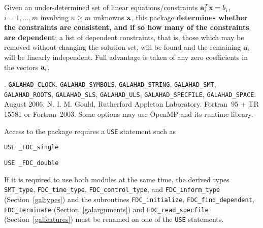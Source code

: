 \documentclass{galahad}
\newcommand{\packagename}{FDC}
\newcommand{\fullpackagename}{\libraryname\_\-\packagename}
\begin{document}
\galheader


\galsummary
Given an under-determined set of linear equations/constraints
${\mathbf{a}}_i^T {\mathbf{x}} = b_i^{}$,
$i = 1, \ldots, m$ involving $n \geq m$ unknowns ${\mathbf{x}}$, this package
{\bf determines whether the constraints are consistent, and if so how many
of the constraints are dependent}; a list of dependent constraints, that
is, those which may be removed without changing the solution set, will be found
and the remaining ${\mathbf{a}}_i$ will be linearly independent.
Full advantage is taken of any zero coefficients in the vectors ${\mathbf{a}}_i$.


\galattributes
\galversions{\tt  \fullpackagename\_single, \fullpackagename\_double}.
\galuses
{\tt GALAHAD\_\-CLOCK},
{\tt GALAHAD\_SY\-M\-BOLS}, {\tt GALAHAD\_\-STRING},
{\tt GALAHAD\_SMT}, {\tt GALAHAD\_\-ROOTS}, {\tt GALAHAD\_\-SLS},
{\tt GALAHAD\_\-ULS}, {\tt GALAHAD\_SPECFILE}, {\tt GALAHAD\-\_SPACE}.
\galdate August  2006.
\galorigin N. I. M. Gould, Rutherford Appleton Laboratory.
\gallanguage Fortran~95 + TR 15581 or Fortran~2003.
\galparallelism Some options may use OpenMP and its runtime library.


\galhowto


Access to the package requires a {\tt USE} statement such as

\medskip{}

\hspace{8mm} {\tt USE \fullpackagename\_single}

\medskip{}

\hspace{8mm} {\tt USE  \fullpackagename\_double}

\medskip

\noindent
If it is required to use both modules at the same time, the derived types
{\tt SMT\_type},
{\tt \packagename\_time\_type},
{\tt \packagename\_control\_type},
and
{\tt \packagename\_inform\_type}
(Section~\ref{galtypes})
and the subroutines
{\tt \packagename\_initialize},
{\tt \packagename\_\-find\_dependent},
{\tt \packagename\_terminate}
(Section~\ref{galarguments})
and
{\tt \packagename\_read\_specfile}
(Section~\ref{galfeatures})
must be renamed on one of the {\tt USE} statements.
\end{document}
